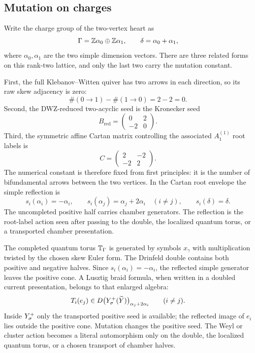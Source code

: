 \subsection*{Mutation on charges}

Write the charge group of the two-vertex heart as
\[
  \Gamma=\mathbb{Z}\alpha_0\oplus\mathbb{Z}\alpha_1,\qquad
  \delta=\alpha_0+\alpha_1,
\]
where $\alpha_0,\alpha_1$ are the two simple dimension vectors.  There
are three related forms on this rank-two lattice, and only the last two
carry the mutation constant.

First, the full Klebanov--Witten quiver has two arrows in each
direction, so its raw skew adjacency is zero:
\[
  \#(0\to1)-\#(1\to0)=2-2=0.
\]
Second, the DWZ-reduced two-acyclic seed is the Kronecker seed
\[
  B_{\mathrm{red}}
  =
  \begin{pmatrix}
  0&2\\
  -2&0
  \end{pmatrix}.
\]
Third, the symmetric affine Cartan matrix controlling the associated
$A_1^{(1)}$ root labels is
\[
  C
  =
  \begin{pmatrix}
  2&-2\\
  -2&2
  \end{pmatrix}.
\]
The numerical constant is therefore fixed from first principles: it is
the number of bifundamental arrows between the two vertices.  In the
Cartan root envelope the simple reflection is
\[
  s_i(\alpha_i)=-\alpha_i,\qquad
  s_i(\alpha_j)=\alpha_j+2\alpha_i\quad (i\neq j),\qquad
  s_i(\delta)=\delta.
\]
The uncompleted positive half carries chamber generators.  The
reflection is the root-label action seen after passing to the double,
the localized quantum torus, or a transported chamber presentation.

The completed quantum torus $\mathbb{T}_{\Gamma}$ is generated by symbols $x_\gamma$
with multiplication twisted by the chosen skew Euler form.  The
Drinfeld double contains both positive and negative halves.  Since
$s_i(\alpha_i)=-\alpha_i$, the reflected simple generator leaves the
positive cone.  A Lusztig braid formula, when written in a doubled
current presentation, belongs to that enlarged algebra:
\[
  T_i(e_j)
  \in
  D\bigl(Y^{+}_\sigma(\widetilde Y)\bigr)_{\alpha_j+2\alpha_i}
  \qquad (i\neq j).
\]
Inside $Y^{+}_\sigma$ only the transported positive seed is available;
the reflected image of $e_i$ lies outside the positive cone.  Mutation
changes the positive seed.  The Weyl or cluster action becomes a
literal automorphism only on the double, the localized quantum torus, or
a chosen transport of chamber halves.

